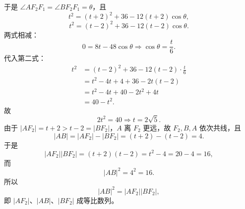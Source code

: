\begin{answer}
于是 $\angle AF_2F_1=\angle BF_2F_1=\theta$，且
\nopagebreak[4]
\[t^2=(t+2)^2+36-12(t+2)\cos\theta,\]
\nopagebreak[4]
\[t^2=(t-2)^2+36-12(t-2)\cos\theta.\]
两式相减：
\nopagebreak[4]
\[0=8t-48\cos\theta
\Longrightarrow \cos\theta=\frac t6.\]
代入第二式：
\nopagebreak[4]
\[\begin{aligned}
t^2&=(t-2)^2+36-12(t-2)\cdot\frac t6\\
&=t^2-4t+4+36-2t(t-2)\\
&=t^2-4t+40-2t^2+4t\\
&=40-t^2.
\end{aligned}\]
故
\nopagebreak[4]
\[2t^2=40\Longrightarrow t=2\sqrt5.\]
由于 $|AF_2|=t+2>t-2=|BF_2|$，$A$ 离 $F_2$ 更远，故 $F_2,B,A$ 依次共线，且
\nopagebreak[4]
\[|AB|=|AF_2|-|BF_2|=(t+2)-(t-2)=4.\]
于是
\nopagebreak[4]
\[|AF_2||BF_2|=(t+2)(t-2)=t^2-4=20-4=16,\]
而
\nopagebreak[4]
\[|AB|^2=4^2=16.\]
所以
\nopagebreak[4]
\[|AB|^2=|AF_2||BF_2|,\]
即 $|AF_2|$、$|AB|$、$|BF_2|$ 成等比数列。



\end{answer}
